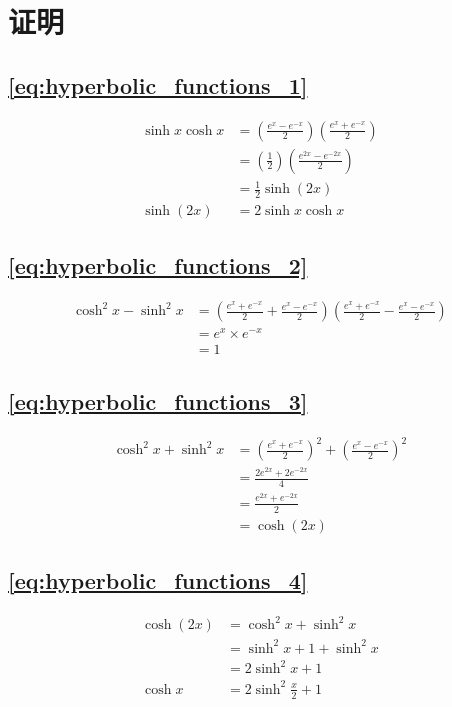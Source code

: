 \section{证明}
\subsection{\ref{eq:hyperbolic_functions_1}}
\begin{displaymath}
\begin{split}
\sinh x\cosh x &= \left(\frac{e^x-e^{-x}}{2}\right)\left(\frac{e^x+e^{-x}}{2}\right) \\
&=\left(\frac{1}{2}\right)\left(\frac{e^{2x}-e^{-2x}}{2}\right) \\
&= \frac{1}{2}\sinh (2x) \\
\sinh (2x) &= 2\sinh x\cosh x
\end{split}
\end{displaymath}

\subsection{\ref{eq:hyperbolic_functions_2}}
\begin{displaymath}
\begin{split}
\cosh^2x-\sinh^2x &=\left(\frac{e^x+e^{-x}}{2}+\frac{e^x-e^{-x}}{2}\right)\left(\frac{e^x+e^{-x}}{2}-\frac{e^x-e^{-x}}{2}\right) \\
&= e^x\times e^{-x} \\
&=1
\end{split}
\end{displaymath}

\subsection{\ref{eq:hyperbolic_functions_3}}
\begin{displaymath}
\begin{split}
\cosh^2x+\sinh^2x &=\left(\frac{e^x+e^{-x}}{2}\right)^2+\left(\frac{e^x-e^{-x}}{2}\right)^2 \\
&=\frac{2e^{2x}+2e^{-2x}}{4} \\
&=\frac{e^{2x}+e^{-2x}}{2} \\
&=\cosh (2x)
\end{split}
\end{displaymath}

\subsection{\ref{eq:hyperbolic_functions_4}}
\begin{displaymath}
\begin{split}
\cosh (2x)  &=\cosh^2x+\sinh^2x \\
&=\sinh^2x +1 +\sinh^2x \\
&=2\sinh^2x +1 \\
\cosh x &=2\sinh^2\frac{x}{2}+1
\end{split}
\end{displaymath}
